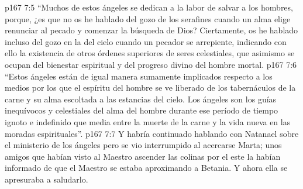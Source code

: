 \vs p167 7:5 “Muchos de estos ángeles se dedican a la labor de salvar a los hombres, porque, ¿es que no os he hablado del gozo de los serafines cuando un alma elige renunciar al pecado y comenzar la búsqueda de Dios? Ciertamente, os he hablado incluso del gozo en la  del cielo cuando un pecador se arrepiente, indicando con ello la existencia de otros órdenes superiores de seres celestiales, que asimismo se ocupan del bienestar espiritual y del progreso divino del hombre mortal.
\vs p167 7:6 “Estos ángeles están de igual manera sumamente implicados respecto a los medios por los que el espíritu del hombre se ve liberado de los tabernáculos de la carne y su alma escoltada a las estancias del cielo. Los ángeles son los guías inequívocos y celestiales del alma del hombre durante ese período de tiempo ignoto e indefinido que media entre la muerte de la carne y la vida nueva en las moradas espirituales”.
\vs p167 7:7 \pc Y habría continuado hablando con Natanael sobre el ministerio de los ángeles pero se vio interrumpido al acercarse Marta; unos amigos que habían visto al Maestro ascender las colinas por el este la habían informado de que el Maestro se estaba aproximando a Betania. Y ahora ella se apresuraba a saludarlo.
